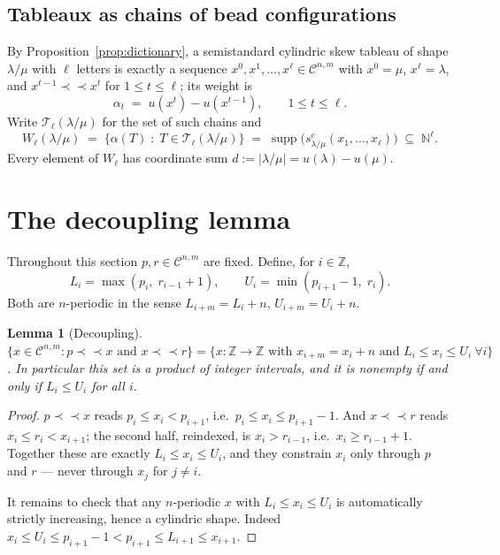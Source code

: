 \documentclass[11pt]{article}
\theoremstyle{plain}
\newtheorem{lem}[thm]{Lemma}
\theoremstyle{definition}
\DeclareMathOperator{\supp}{supp}
\newcommand{\Z}{\mathbb{Z}}
\newcommand{\N}{\mathbb{N}}
\newcommand{\cyl}{\mathcal{C}}
\newcommand{\hstrip}{\prec\!\!\prec}
\begin{document}
\subsection{Tableaux as chains of bead configurations}

By Proposition~\ref{prop:dictionary}, a semistandard cylindric skew tableau of shape
$\lambda/\mu$ with $\ell$ letters is exactly a sequence
$x^0,x^1,\dots,x^\ell\in\cyl^{n,m}$ with $x^0=\mu$, $x^\ell=\lambda$, and
$x^{t-1}\hstrip x^{t}$ for $1\le t\le\ell$; its weight is
\begin{equation}\label{eq:weight}
  \alpha_t \;=\; u(x^{t})-u(x^{t-1}),\qquad 1\le t\le \ell .
\end{equation}
Write $\mathcal{T}_\ell(\lambda/\mu)$ for the set of such chains and
\[
  W_\ell(\lambda/\mu)\;=\;\bigl\{\alpha(T)\;:\;T\in\mathcal{T}_\ell(\lambda/\mu)\bigr\}
  \;=\;\supp\bigl(s^{c}_{\lambda/\mu}(x_1,\dots,x_\ell)\bigr)\;\subseteq\;\N^{\ell}.
\]
Every element of $W_\ell$ has coordinate sum $d:=|\lambda/\mu|=u(\lambda)-u(\mu)$.

\section{The decoupling lemma}\label{sec:decoupling}

Throughout this section $p,r\in\cyl^{n,m}$ are fixed. Define, for $i\in\Z$,
\begin{equation}\label{eq:LU}
  L_i=\max(p_i,\;r_{i-1}+1),\qquad U_i=\min(p_{i+1}-1,\;r_i).
\end{equation}
Both are $n$-periodic in the sense $L_{i+m}=L_i+n$, $U_{i+m}=U_i+n$.

\begin{lem}[Decoupling]\label{lem:box}
$\{x\in\cyl^{n,m}: p\hstrip x \text{ and } x\hstrip r\}
 =\{x:\Z\to\Z \text{ with } x_{i+m}=x_i+n \text{ and } L_i\le x_i\le U_i\ \forall i\}$.
In particular this set is a product of integer intervals, and it is nonempty if and only if
$L_i\le U_i$ for all $i$.
\end{lem}

\begin{proof}
$p\hstrip x$ reads $p_i\le x_i<p_{i+1}$, i.e.\ $p_i\le x_i\le p_{i+1}-1$. And $x\hstrip r$ reads
$x_i\le r_i<x_{i+1}$; the second half, reindexed, is $x_i>r_{i-1}$, i.e.\ $x_i\ge r_{i-1}+1$.
Together these are exactly $L_i\le x_i\le U_i$, and they constrain $x_i$ only through $p$ and
$r$ --- never through $x_j$ for $j\neq i$.

It remains to check that any $n$-periodic $x$ with $L_i\le x_i\le U_i$ is automatically
strictly increasing, hence a cylindric shape. Indeed $x_i\le U_i\le p_{i+1}-1<p_{i+1}\le
L_{i+1}\le x_{i+1}$.
\end{proof}
\end{document}
